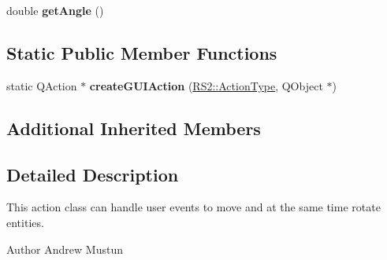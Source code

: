 \begin{DoxyCompactItemize}
\item 
\hypertarget{classRS__ActionModifyMoveRotate_ad8359b6e10d8c967fd9017490e9eec8a}{double {\bfseries get\-Angle} ()}\label{classRS__ActionModifyMoveRotate_ad8359b6e10d8c967fd9017490e9eec8a}

\end{DoxyCompactItemize}
\subsection*{Static Public Member Functions}
\begin{DoxyCompactItemize}
\item 
\hypertarget{classRS__ActionModifyMoveRotate_a7bc2f6c9b460da84f26360ff437c9e65}{static Q\-Action $\ast$ {\bfseries create\-G\-U\-I\-Action} (\hyperlink{classRS2_afe3523e0bc41fd637b892321cfc4b9d7}{R\-S2\-::\-Action\-Type}, Q\-Object $\ast$)}\label{classRS__ActionModifyMoveRotate_a7bc2f6c9b460da84f26360ff437c9e65}

\end{DoxyCompactItemize}
\subsection*{Additional Inherited Members}


\subsection{Detailed Description}
This action class can handle user events to move and at the same time rotate entities.

\begin{DoxyAuthor}{Author}
Andrew Mustun 
\end{DoxyAuthor}


